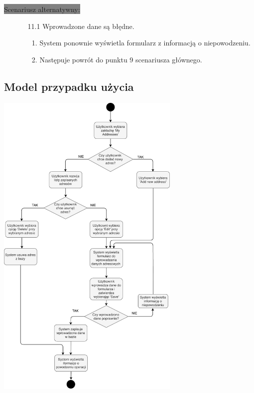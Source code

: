 \documentclass[10pt]{report}
\begin{document}
		\colorbox{grey}{Scenariusz alternatywny:}
		\begin{enumerate}\addtocounter{enumi}{6}
			\item[]
			\begin{enumerate}
				\item[11.1] Wprowadzone dane są błędne.
				\begin{enumerate}
					\item System ponownie wyświetla formularz z informacją o niepowodzeniu.
					\item Następuje powrót do punktu 9 scenariusza głównego.
				\end{enumerate}
			\end{enumerate}
		\end{enumerate}
	\subsection{Model przypadku użycia}
	\begin{center}
		\includegraphics[width=250pt]{ustawienia.pdf}
	\end{center}
	 
\end{document}

